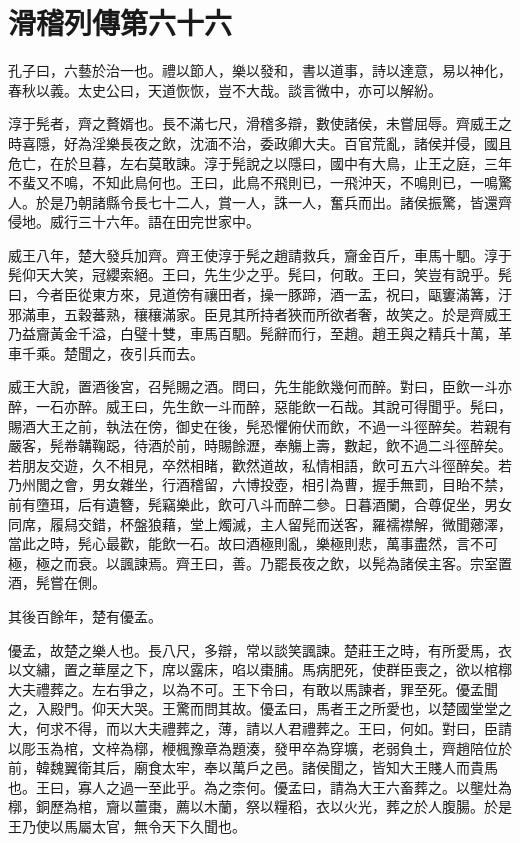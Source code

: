 \chapter{滑稽列傳第六十六}

孔子曰，六藝於治一也。禮以節人，樂以發和，書以道事，詩以達意，易以神化，春秋以義。太史公曰，天道恢恢，豈不大哉。談言微中，亦可以解紛。

淳于髡者，齊之贅婿也。長不滿七尺，滑稽多辯，數使諸侯，未嘗屈辱。齊威王之時喜隱，好為淫樂長夜之飲，沈湎不治，委政卿大夫。百官荒亂，諸侯并侵，國且危亡，在於旦暮，左右莫敢諫。淳于髡說之以隱曰，國中有大鳥，止王之庭，三年不蜚又不鳴，不知此鳥何也。王曰，此鳥不飛則已，一飛沖天，不鳴則已，一鳴驚人。於是乃朝諸縣令長七十二人，賞一人，誅一人，奮兵而出。諸侯振驚，皆還齊侵地。威行三十六年。語在田完世家中。

威王八年，楚大發兵加齊。齊王使淳于髡之趙請救兵，齎金百斤，車馬十駟。淳于髡仰天大笑，冠纓索絕。王曰，先生少之乎。髡曰，何敢。王曰，笑豈有說乎。髡曰，今者臣從東方來，見道傍有禳田者，操一豚蹄，酒一盂，祝曰，甌窶滿篝，汙邪滿車，五穀蕃熟，穰穰滿家。臣見其所持者狹而所欲者奢，故笑之。於是齊威王乃益齎黃金千溢，白璧十雙，車馬百駟。髡辭而行，至趙。趙王與之精兵十萬，革車千乘。楚聞之，夜引兵而去。

威王大說，置酒後宮，召髡賜之酒。問曰，先生能飲幾何而醉。對曰，臣飲一斗亦醉，一石亦醉。威王曰，先生飲一斗而醉，惡能飲一石哉。其說可得聞乎。髡曰，賜酒大王之前，執法在傍，御史在後，髡恐懼俯伏而飲，不過一斗徑醉矣。若親有嚴客，髡帣韝鞠跽，待酒於前，時賜餘瀝，奉觴上壽，數起，飲不過二斗徑醉矣。若朋友交遊，久不相見，卒然相睹，歡然道故，私情相語，飲可五六斗徑醉矣。若乃州閭之會，男女雜坐，行酒稽留，六博投壺，相引為曹，握手無罰，目眙不禁，前有墮珥，后有遺簪，髡竊樂此，飲可八斗而醉二參。日暮酒闌，合尊促坐，男女同席，履舄交錯，杯盤狼藉，堂上燭滅，主人留髡而送客，羅襦襟解，微聞薌澤，當此之時，髡心最歡，能飲一石。故曰酒極則亂，樂極則悲，萬事盡然，言不可極，極之而衰。以諷諫焉。齊王曰，善。乃罷長夜之飲，以髡為諸侯主客。宗室置酒，髡嘗在側。

其後百餘年，楚有優孟。

優孟，故楚之樂人也。長八尺，多辯，常以談笑諷諫。楚莊王之時，有所愛馬，衣以文繡，置之華屋之下，席以露床，啗以棗脯。馬病肥死，使群臣喪之，欲以棺槨大夫禮葬之。左右爭之，以為不可。王下令曰，有敢以馬諫者，罪至死。優孟聞之，入殿門。仰天大哭。王驚而問其故。優孟曰，馬者王之所愛也，以楚國堂堂之大，何求不得，而以大夫禮葬之，薄，請以人君禮葬之。王曰，何如。對曰，臣請以彫玉為棺，文梓為槨，楩楓豫章為題湊，發甲卒為穿壙，老弱負土，齊趙陪位於前，韓魏翼衛其后，廟食太牢，奉以萬戶之邑。諸侯聞之，皆知大王賤人而貴馬也。王曰，寡人之過一至此乎。為之柰何。優孟曰，請為大王六畜葬之。以壟灶為槨，銅歷為棺，齎以薑棗，薦以木蘭，祭以糧稻，衣以火光，葬之於人腹腸。於是王乃使以馬屬太官，無令天下久聞也。

